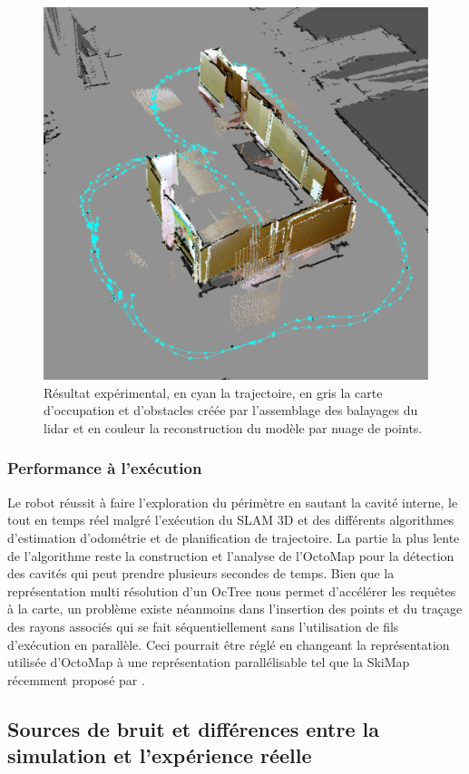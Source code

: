 \begin{figure}[!ht]
  \centering
  \includegraphics[width=0.5\linewidth]{images/exp_angled_view}
  \caption[Résultat de l'expérience par UGV]{Résultat expérimental, en cyan la trajectoire, en gris la carte d'occupation et d'obstacles créée par l'assemblage des balayages du lidar et en couleur la reconstruction du modèle par nuage de points.}
  \label{fig:exp_angled_view}
\end{figure}

\subsubsection{Performance à l'exécution}

Le robot réussit à faire l'exploration du périmètre en sautant la cavité interne, le tout en temps réel malgré l'exécution du SLAM 3D et des différents algorithmes d'estimation d'odométrie et de planification de trajectoire. La partie la plus lente de l'algorithme reste la construction et l'analyse de l'OctoMap pour la détection des cavités qui peut prendre plusieurs secondes de temps. Bien que la représentation multi résolution d'un OcTree nous permet d'accélérer les requêtes à la carte, un problème existe néanmoins dans l'insertion des points et du traçage des rayons associés qui se fait séquentiellement sans l'utilisation de fils d'exécution en parallèle. Ceci pourrait être réglé en changeant la représentation utilisée d'OctoMap à une représentation parallélisable tel que la SkiMap récemment proposé par \citep{Gregorio2017}.

\subsection{Sources de bruit et différences entre la simulation et l'expérience réelle}
\label{subsec:ugv_noise_sim}

